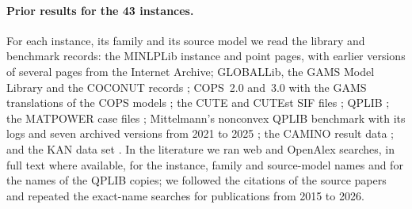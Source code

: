\paragraph{Prior results for the 43 instances.}
For each instance, its family and its source model we read the library and benchmark records:
the MINLPLib instance and point pages, with earlier versions of several pages from the Internet Archive;
GLOBALLib, the GAMS Model Library and the COCONUT records \citep{coconut2026-globallib-gams-coconut-and-minlplib};
COPS~2.0 and~3.0 with the GAMS translations of the COPS models \citep{dolan2001-benchmarking-optimization-software-with-cops,dolan2004-benchmarking-optimization-software-with-cops-2,library2026-cops-and-gams-source-models};
the CUTE and CUTEst SIF files \citep{toint2013-cute-hvycrash-source-sif-files,luksan2026-cutest-source-forms-for-dtoc5};
QPLIB \citep{cache2026-qplib-pages-and-rounded-camshape,furini2026-qplib-official-solution-point-records};
the MATPOWER case files \citep{matpower2026-minlplib-power-flow-and-water};
Mittelmann's nonconvex QPLIB benchmark with its logs and seven archived versions from 2021 to 2025 \citep{mittelmann2026-continuous-non-convex-qplib-benchmark};
the CAMINO result data \citep{ghezzi2026-camino-benchmark-results-for-nonconvex};
and the KAN data set \citep{karia2025-karia-et-al-zenodo-default}.
In the literature we ran web and OpenAlex searches, in full text where available, for the instance, family and source-model names and for the names of the QPLIB copies; we followed the citations of the source papers and repeated the exact-name searches for publications from 2015 to 2026.

